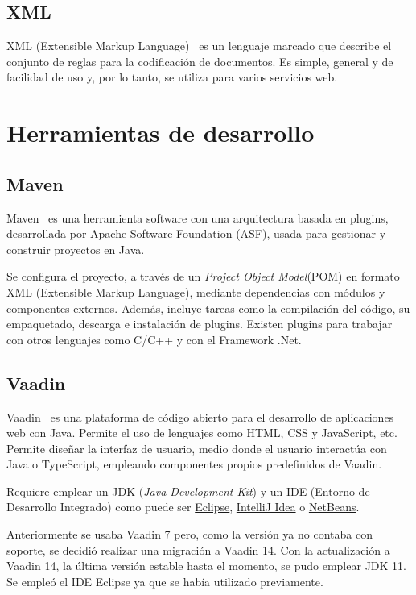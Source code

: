 \subsection{XML}
XML (Extensible Markup Language)~\cite{pagina_xml} es un lenguaje marcado que describe el conjunto de reglas para la codificación de documentos. Es simple, general y de facilidad de uso y, por lo tanto, se utiliza para varios servicios web.

\section{Herramientas de desarrollo}
\subsection{Maven}
Maven~\cite{pagina_maven} es una herramienta software con una arquitectura basada en plugins, desarrollada por Apache Software Foundation (ASF), usada para gestionar y construir proyectos en Java. 

Se configura el proyecto, a través de un \emph{Project Object Model}(POM) en formato XML (Extensible Markup Language), mediante dependencias con módulos y componentes externos. Además, incluye tareas como la compilación del código, su empaquetado, descarga e instalación de plugins. Existen plugins para trabajar con otros lenguajes como C/C++ y con el Framework .Net. 

\subsection{Vaadin}
Vaadin~\cite{pagina_vaadin} es una plataforma de código abierto para el desarrollo de aplicaciones web con Java. Permite el uso de lenguajes como HTML, CSS y JavaScript, etc. Permite diseñar la interfaz de usuario, medio donde el usuario interactúa con Java o TypeScript, empleando componentes propios predefinidos de Vaadin.

Requiere emplear un JDK (\textit{Java Development Kit}) y un IDE (Entorno de Desarrollo Integrado) como puede ser \href{https://www.eclipse.org/downloads/}{Eclipse}, \href{https://www.jetbrains.com/es-es/idea/}{IntelliJ Idea} o \href{https://netbeans.apache.org/}{NetBeans}.

Anteriormente se usaba Vaadin 7 pero, como la versión ya no contaba con soporte, se decidió realizar una migración a Vaadin 14. Con la actualización a Vaadin 14, la última versión estable hasta el momento, se pudo emplear JDK 11. Se empleó el IDE Eclipse ya que se había utilizado previamente.

